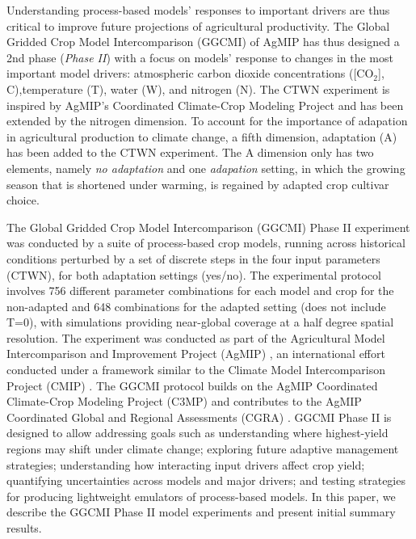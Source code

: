 \documentclass[gmd, manuscript]{copernicus} %
\begin{document}
Understanding process-based models' responses to important drivers are thus critical to improve future projections of agricultural productivity.
The Global Gridded Crop Model Intercomparison (GGCMI) of AgMIP \citep{Elliott2015} has thus designed a 2nd phase (\textit{Phase II}) with a focus on models' response to changes in the most important model drivers: atmospheric carbon dioxide concentrations ([CO$_2$], C),temperature (T), water (W), and nitrogen (N). 
The CTWN experiment is inspired by AgMIP's Coordinated Climate-Crop Modeling Project \citep[C3MP][]{ruane2014,mcdermid2015agmip} and has been extended by the nitrogen dimension. 
To account for the importance of adapation in agricultural production to climate change, a fifth dimension, adaptation (A) has been added to the CTWN experiment. 
The {A} dimension only has two elements, namely \textit{no adaptation} and one \textit{adapation} setting, in which the growing season that is shortened under warming, is regained by adapted crop cultivar choice.

The Global Gridded Crop Model Intercomparison (GGCMI) Phase II experiment was conducted by a suite of process-based crop models, running across historical conditions perturbed by a set of discrete steps in the four input parameters (CTWN), for both adaptation settings (yes/no). 
The experimental protocol involves 756 different parameter combinations for each model and crop for the non-adapted and 648 combinations for the adapted setting (does not include T=0), with simulations providing near-global coverage at a half degree spatial resolution. 
The experiment was conducted as part of the Agricultural Model Intercomparison and Improvement Project (AgMIP) \citep{ROSENZWEIG2013, Rosenzweig2014}, an international effort conducted under a framework similar to the Climate Model Intercomparison Project (CMIP) \citep{Taylor2012, Eyring2016}. 
The GGCMI protocol builds on the AgMIP Coordinated Climate-Crop Modeling Project (C3MP) \citep{ruane2014, mcdermid2015agmip} and contributes to the AgMIP Coordinated Global and Regional Assessments (CGRA) \citep{ruane2018, rosenzweig2018}. 
GGCMI Phase II is designed to allow addressing goals such as understanding where highest-yield regions may shift under climate change; exploring future adaptive management strategies; understanding how interacting input drivers affect crop yield; quantifying uncertainties across models and major drivers; and testing strategies for producing lightweight emulators of process-based models. 
In this paper, we describe the GGCMI Phase II model experiments and present initial summary results.
\end{document}
